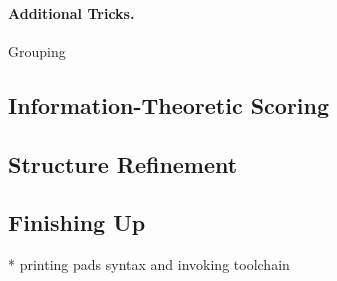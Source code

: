 \paragraph*{Additional Tricks.}
Grouping




\subsection {Information-Theoretic Scoring}



\subsection {Structure Refinement}

%


 

\subsection {Finishing Up}

    * printing pads syntax and invoking toolchain
